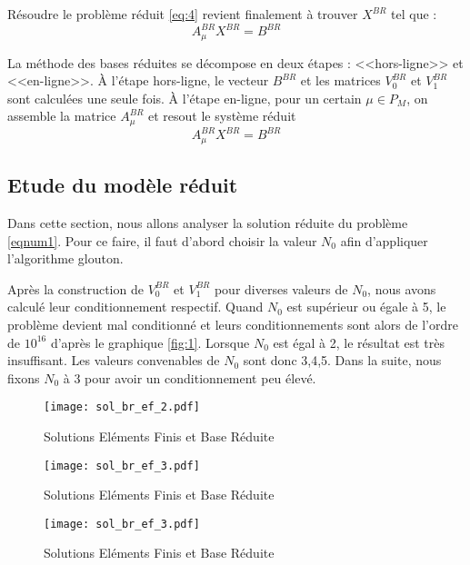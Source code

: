 \documentclass[12pt]{article}
\begin{document}
\noindent Résoudre le problème réduit \eqref{eq:4} revient finalement à trouver $X^{BR}$ tel que :
$$A^{BR}_{\mu} X^{BR} = B^{BR} $$ 


\noindent La méthode des bases réduites se décompose en deux étapes : <<hors-ligne>> et <<en-ligne>>. À l’étape hors-ligne, le vecteur $B^{BR}$ et les matrices $V_{0}^{BR}$ et $V_{1}^{BR}$ sont calculées une seule fois. À l’étape en-ligne, pour un certain $\mu \in P_{M}$, on assemble la matrice $A^{BR}_{\mu}$ et resout le système réduit $$A^{BR}_{\mu} X^{BR} = B^{BR}$$









\subsection{Etude du modèle réduit}
Dans cette section, nous allons analyser la solution réduite du problème \eqref{eqnum1}. Pour ce faire, il faut d'abord choisir la valeur $N_{0}$ afin d'appliquer l'algorithme glouton.

Après la construction de $V_{0}^{BR}$ et $V_{1}^{BR}$ pour diverses valeurs de $N_{0}$, nous avons calculé leur conditionnement respectif. Quand $N_{0}$ est supérieur ou égale à 5, le problème devient mal conditionné et leurs conditionnements sont alors de l'ordre de $10^{16}$ d'après le graphique \eqref{fig:1}. Lorsque $N_{0}$ est égal à 2, le résultat est très insuffisant. Les valeurs convenables de $N_{0}$ sont donc 3,4,5. 
Dans la suite, nous fixons $N_{0}$ à 3 pour avoir un conditionnement peu élevé.


\begin{figure}[H] 
\begin{center}
\texttt{[image: sol\_br\_ef\_2.pdf]}
\caption[]{Solutions Eléments Finis et Base Réduite  }
\end{center}
\label{fig:1}
\end{figure}

\begin{figure}[H] 
\begin{center}
\texttt{[image: sol\_br\_ef\_3.pdf]}
\caption[]{Solutions Eléments Finis et Base Réduite  }
\end{center}
\label{fig:1}
\end{figure}

\begin{figure}[H] 
\begin{center}
\texttt{[image: sol\_br\_ef\_3.pdf]}
\caption[]{Solutions Eléments Finis et Base Réduite  }
\end{center}
\label{fig:1}
\end{figure}
\end{document}

